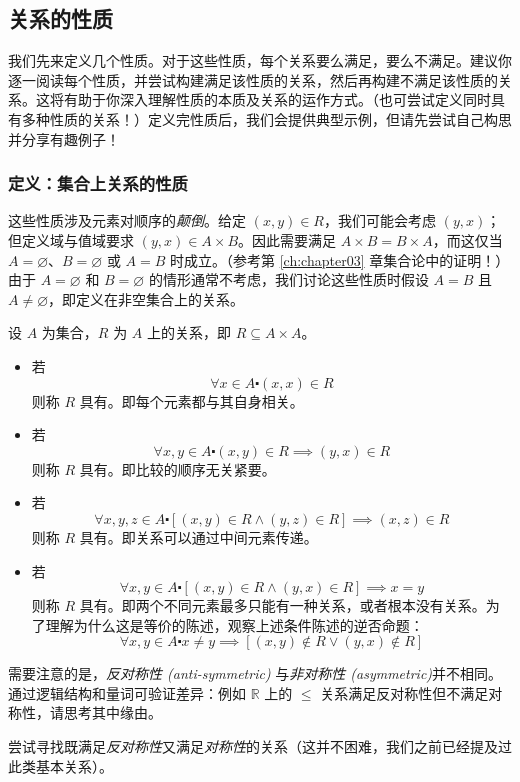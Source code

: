 
\subsection{关系的性质}

我们先来定义几个性质。对于这些性质，每个关系要么满足，要么不满足。建议你逐一阅读每个性质，并尝试构建满足该性质的关系，然后再构建不满足该性质的关系。这将有助于你深入理解性质的本质及关系的运作方式。（也可尝试定义同时具有多种性质的关系！）定义完性质后，我们会提供典型示例，但请先尝试自己构思并分享有趣例子！

\subsubsection*{定义：集合上关系的性质}

这些性质涉及元素对顺序的\emph{颠倒}。给定 $(x, y) \in R$，我们可能会考虑 $(y, x)$；但定义域与值域要求 $(y, x) \in A \times B$。因此需要满足 $A \times B = B \times A$，而这仅当 $A = \varnothing$、$B = \varnothing$ 或 $A = B$ 时成立。（参考第 \ref{ch:chapter03} 章集合论中的证明！）由于 $A = \varnothing$ 和 $B = \varnothing$ 的情形通常不考虑，我们讨论这些性质时假设 $A = B$ 且 $A \ne \varnothing$，即定义在非空集合上的关系。

\begin{definition}
    设 $A$ 为集合，$R$ 为 $A$ 上的关系，即 $R \subseteq A \times A$。
    \begin{itemize}
        \item 若
            \[\forall x \in A \centerdot (x, x) \in R\]
            则称 $R$ 具有。即每个元素都与其自身相关。
        \item 若
            \[\forall x,y \in A \centerdot (x, y) \in R \implies (y,x) \in R\]
            则称 $R$ 具有。即比较的顺序无关紧要。
        \item 若
            \[\forall x, y, z \in A \centerdot [(x, y) \in R \land (y, z) \in R] \implies (x, z) \in R\]
            则称 $R$ 具有。即关系可以通过中间元素传递。
        \item 若
            \[\forall x, y \in A \centerdot [(x, y) \in R \land (y, x) \in R] \implies x = y\]
            则称 $R$ 具有。即两个不同元素最多只能有一种关系，或者根本没有关系。为了理解为什么这是等价的陈述，观察上述条件陈述的逆否命题：
            \[\forall x, y \in A \centerdot x \ne y \implies [(x, y) \notin R \lor (y, x) \notin R]\]
    \end{itemize}
\end{definition}

需要注意的是，\emph{反对称性 (anti-symmetric)} 与\emph{非对称性 (asymmetric)}并不相同。通过逻辑结构和量词可验证差异：例如 $\mathbb{R}$ 上的 $\le$ 关系满足反对称性但不满足对称性，请思考其中缘由。

尝试寻找既满足\emph{反对称性}又满足\emph{对称性}的关系（这并不困难，我们之前已经提及过此类基本关系）。
